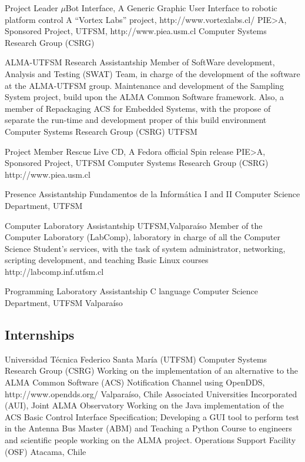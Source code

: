 \documentclass[11pt,a4paper]{moderncv}
\begin{document}
	{Project Leader}
	{$\mu$Bot Interface, A Generic Graphic User Interface to robotic platform control}
	{A ``Vortex Labs'' project, http://www.vortexlabs.cl/}
	{PIE>A, Sponsored Project, UTFSM, http://www.piea.usm.cl}
	{Computer Systems Research Group (CSRG)}

	{ALMA-UTFSM Research Assistantship}
	{Member of SoftWare development, Analysis and Testing (SWAT) Team, in charge of the development of the software at the ALMA-UTFSM group. 
	Maintenance and development of the Sampling System project, build upon the ALMA Common Software framework.
	Also, a member of Repackaging ACS for Embedded Systems, with the propose of separate the run-time and development
	proper of this build environment}
	{Computer Systems Research Group (CSRG)}
	{UTFSM}
	{}

	{Project Member}
	{Rescue Live CD, A Fedora official Spin release}
	{PIE>A, Sponsored Project, UTFSM}
	{Computer Systems Research Group (CSRG)}
	{http://www.piea.usm.cl}

	{Presence Assistantship}
	{Fundamentos de la Informática  I and II}
	{Computer Science Department, UTFSM}
	{}{}

	{Computer Laboratory Assistantship}
	{UTFSM,Valparaíso}
	{Member of the Computer Laboratory (LabComp), laboratory in charge of all the Computer Science Student's services, with the task of system administrator, networking, scripting development, and teaching Basic Linux courses}
	{http://labcomp.inf.utfsm.cl}{}

	{Programming Laboratory Assistantship}
	{C language}
	{Computer Science Department, UTFSM}
	{Valparaíso}
	{}

\subsection{Internships}

	{Universidad Técnica Federico Santa María (UTFSM)}
	{Computer Systems Research Group (CSRG)}
	{Working on the implementation of an alternative to the ALMA Common Software (ACS) Notification Channel using OpenDDS, http://www.opendds.org/}
	{Valparaíso, Chile}
	{Associated Universities Incorporated (AUI), Joint ALMA Observatory}
	{Working on the Java implementation of the ACS Basic Control Interface Specification; Developing a GUI tool to perform test in the Antenna Bus Master (ABM) and Teaching a Python Course to engineers and scientific people working on the ALMA project.}
	{Operations Support Facility (OSF)}
	{Atacama, Chile}
\end{document}
